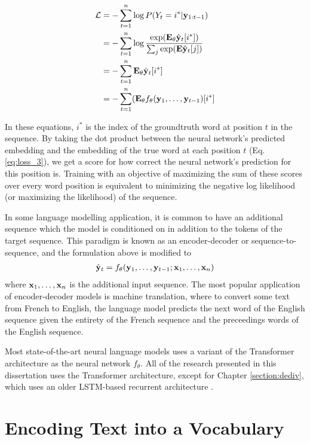 \begin{align}
\mathcal{L} &= -\sum_{t=1}^n \log P(Y_t=i^* | \mathbf{y}_{1:t-1}) \\
&= -\sum_{t=1}^n \log\frac{\exp(\mathbf{E}_\theta\hat{\mathbf{y}}_t[i^*])}{\sum_j\exp(\mathbf{E}\hat{\mathbf{y}}_t[j])} \label{eq:loss_2} \\
&= -\sum_{t=1}^n \mathbf{E}_\theta\hat{\mathbf{y}}_t[i^*] \label{eq:loss_3} \\
&= -\sum_{t=1}^n (\mathbf{E}_\theta f_\theta(\mathbf{y}_1, \ldots, \mathbf{y}_{t-1})[i^*]
\end{align}

In these equations, $i^*$ is the index of the groundtruth word at position $t$ in the sequence. 
By taking the dot product between the neural network's predicted embedding and the embedding of the true word at each position $t$ (Eq. \ref{eq:loss_3}), we get a score for how correct the neural network's prediction for this position is.
Training with an objective of maximizing the sum of these scores over every word position is equivalent to minimizing the negative log likelihood (or maximizing the likelihood) of the sequence.

In some language modelling application, it is common to have an additional sequence which the model is conditioned on in addition to the tokens of the target sequence.
This paradigm is known as an encoder-decoder or sequence-to-sequence, and the formulation above is modified to
\begin{align}
    \hat{\mathbf{y}}_t = f_\theta(\mathbf{y}_1, \ldots, \mathbf{y}_{t-1}; \mathbf{x}_1, \ldots, \mathbf{x}_n)
    \label{eq:cond_lm_feq}
\end{align}
where $\mathbf{x}_1, \ldots, \mathbf{x}_n$ is the additional input sequence. 
The most popular application of encoder-decoder models is machine translation, where to convert some text from French to English, the language model predicts the next word of the English sequence given the entirety of the French sequence and the preceedings words of the English sequence.

Most state-of-the-art neural language models uses a variant of the Transformer architecture \cite{vaswani2017attention} as the neural network $f_\theta$.
All of the research presented in this dissertation uses the Transformer architecture, except for Chapter \ref{section:dediv}, which uses an older LSTM-based recurrent architecture \citep{hochreiter1997long}.

\section{Encoding Text into a Vocabulary}

